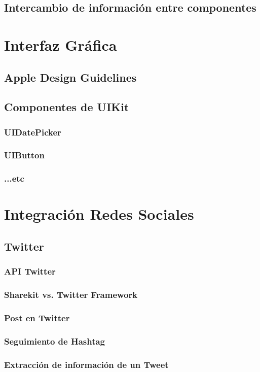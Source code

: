 	\subsection{Intercambio de información entre componentes}
\clearpage
\section{Interfaz Gráfica}
	\subsection{Apple Design Guidelines}
	\subsection{Componentes de UIKit}
		\subsubsection{UIDatePicker}
		\subsubsection{UIButton}
		\subsubsection{...etc}
\clearpage
\section{Integración Redes Sociales}
	\subsection{Twitter}
		\subsubsection{API Twitter}
		\subsubsection{Sharekit vs. Twitter Framework}
		\subsubsection{Post en Twitter}
		\subsubsection{Seguimiento de Hashtag}
		\subsubsection{Extracción de información de un Tweet}
